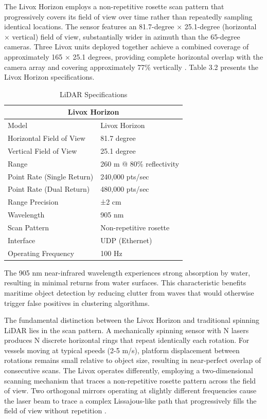 \documentclass{erauthesis}
\begin{document}
The Livox Horizon employs a non-repetitive rosette scan pattern that progressively covers its field of view over time rather than repeatedly sampling identical locations.
The sensor features an 81.7-degree × 25.1-degree (horizontal × vertical) field of view, substantially wider in azimuth than the 65-degree cameras.
Three Livox units deployed together achieve a combined coverage of approximately 165 × 25.1 degrees, providing complete horizontal overlap with the camera array and covering approximately 77\% vertically \cite{thompson2023}.
Table 3.2 presents the Livox Horizon specifications.

\begin{table}[h]
\centering
\caption{LiDAR Specifications}
\begin{tabular}{ll}
\hline
\multicolumn{2}{c}{Livox Horizon}\\
\hline
\hline
Model & Livox Horizon \\
Horizontal Field of View & 81.7 degree \\
Vertical Field of View & 25.1 degree \\
Range & 260 m @ 80\% reflectivity \\
Point Rate (Single Return) & 240,000 pts/sec \\
Point Rate (Dual Return) & 480,000 pts/sec \\
Range Precision & ±2 cm \\
Wavelength & 905 nm \\
Scan Pattern & Non-repetitive rosette \\
Interface & UDP (Ethernet) \\
Operating Frequency & 100 Hz \\
\hline
\end{tabular}
\label{tab:livox_horizon_specs}
\end{table}

The 905 nm near-infrared wavelength experiences strong absorption by water, resulting in minimal returns from water surfaces.
This characteristic benefits maritime object detection by reducing clutter from waves that would otherwise trigger false positives in clustering algorithms.

The fundamental distinction between the Livox Horizon and traditional spinning \ac{LiDAR} lies in the scan pattern.
A mechanically spinning sensor with N lasers produces N discrete horizontal rings that repeat identically each rotation.
For vessels moving at typical speeds (2-5 m/s), platform displacement between rotations remains small relative to object size, resulting in near-perfect overlap of consecutive scans.
The Livox operates differently, employing a two-dimensional scanning mechanism that traces a non-repetitive rosette pattern across the field of view.
Two orthogonal mirrors operating at slightly different frequencies cause the laser beam to trace a complex Lissajous-like path that progressively fills the field of view without repetition \cite{thompson2023}.
\end{document}
